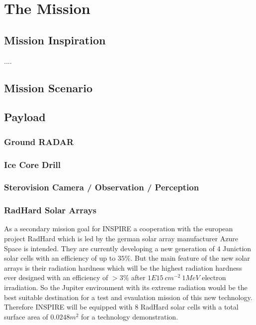 %
%
%
\chapter{The Mission}
\label{chap:mission}

\section{Mission Inspiration}
\label{sec:inspiration}
....



\section{Mission Scenario}
\label{sec:scenario}


\section{Payload}



\subsection{Ground RADAR}

\subsection{Ice Core Drill}

\subsection{Sterovision Camera / Observation / Perception}

\subsection{RadHard Solar Arrays}
\label{subsec:radhard}
As a secondary mission goal for INSPIRE a cooperation with the european project RadHard which is led by the german solar array manufacturer Azure Space is intended. They are currently developing a new generation of $4$ Juniction solar cells with an efficiency of up to $35 \% $. But the main feature of the new solar arrays is their radiation hardness which will be the highest radiation hardness ever designed with an efficiency of $>3 \% $ after $1E15 \ cm^{-2} \ 1MeV$ electron irradiation. So the Jupiter environment with its extreme radiation would be the best suitable destination for a test and evaulation mission of this new technology. Therefore INSPIRE will be equipped with $8$ RadHard solar cells with a total surface area of $0.0248 m^2$ for a technology demonstration\cite{FraunhoferInstituteforSolarEnergySystemsISE.2021}.


